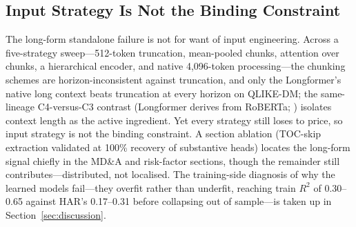 \subsection{Input Strategy Is Not the Binding Constraint}
\label{sec:ab-input}

The long-form standalone failure is not for want of input engineering. Across a five-strategy sweep---512-token truncation, mean-pooled chunks, attention over chunks, a hierarchical encoder, and native 4{,}096-token processing---the chunking schemes are horizon-inconsistent against truncation, and only the Longformer's native long context \citep{beltagy2020longformer} beats truncation at every horizon on QLIKE-DM; the same-lineage C4-versus-C3 contrast (Longformer derives from RoBERTa; \citealp{liu2019roberta}) isolates context length as the active ingredient. Yet every strategy still loses to price, so input strategy is not the binding constraint. A section ablation (TOC-skip extraction validated at 100\% recovery of substantive heads) locates the long-form signal chiefly in the MD\&A and risk-factor sections, though the remainder still contributes---distributed, not localised. The training-side diagnosis of why the learned models fail---they overfit rather than underfit, reaching train $R^2$ of 0.30--0.65 against HAR's 0.17--0.31 before collapsing out of sample---is taken up in Section~\ref{sec:discussion}.

